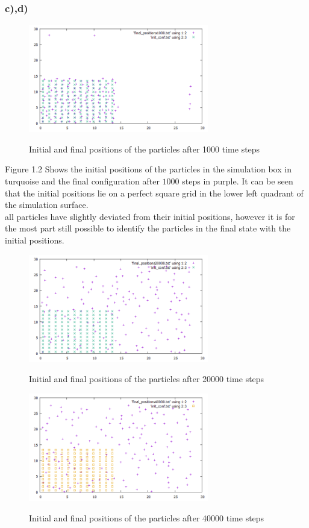 \documentclass[12pt,a4paper]{article}	%
\begin{document}
\subsubsection*{c),d)}
\begin{figure}[h!]	
\centering
{\includegraphics[width=0.7\textwidth]{initial_final_pos_1000.png}}		
\caption{Initial and final positions of the particles after 1000 time steps}

\end{figure}
Figure 1.2 Shows the initial positions of the particles in the simulation box in turquoise and the final configuration after $1000$ steps in purple. It can be seen that the initial positions lie on a perfect square grid in the lower left quadrant of the simulation surface. \\
all particles have slightly deviated from their initial positions, however it is for the most part still possible to identify the particles in the final state with the initial positions.

\begin{figure}[h!]	
\centering
{\includegraphics[width=0.7\textwidth]{initial_final_pos_20000.png}}		
\caption{Initial and final positions of the particles after 20000 time steps}
\end{figure}

\begin{figure}[h!]	
\centering
{\includegraphics[width=0.7\textwidth]{initial_final_pos_40000.png}}		
\caption{Initial and final positions of the particles after 40000 time steps}
\end{figure}
\end{document}
